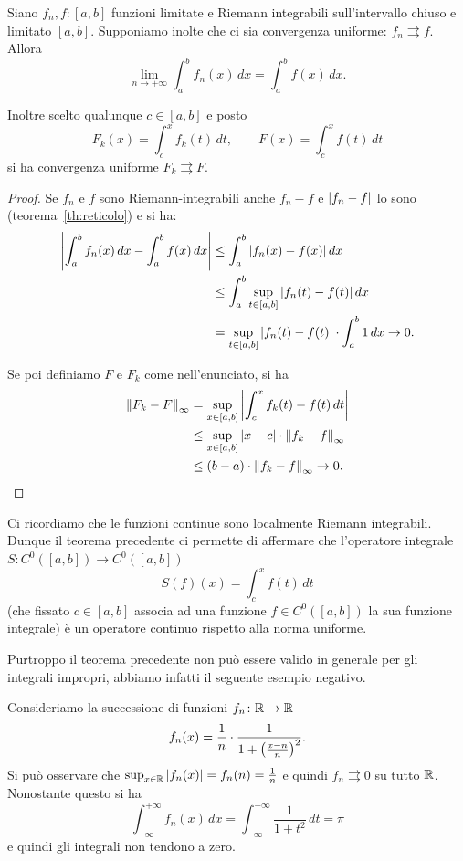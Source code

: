 \begin{theorem}%
  \label{th:scambio_limite_integrale}%
  \mymark{***}%
  Siano $f_n,f\colon [a,b]$ funzioni limitate 
  e Riemann integrabili sull'intervallo chiuso e limitato $[a,b]$.
  Supponiamo inolte che ci sia convergenza uniforme: 
  $f_n \rightrightarrows f$.
  Allora 
  \[
      \lim_{n\to+\infty} \int_a^b f_n(x)\, dx 
      = \int_a^b f(x)\, dx.
  \]

  Inoltre scelto qualunque $c\in [a,b]$ e posto
  \[
    F_k(x) = \int_{c}^x f_k(t)\, dt,
    \qquad
    F(x) = \int_{c}^x f(t)\, dt
  \]
  si ha convergenza uniforme $F_k \rightrightarrows F$.
\end{theorem}
\begin{proof}
  Se $f_n$ e $f$ sono Riemann-integrabili anche $f_n-f$ e ${\left|f_n-f\right|}$ lo sono 
  (teorema~\ref{th:reticolo})
  e si ha:
  \begin{align*}
    {\left|\int_a^b f_n(x)\, dx - \int_a^b f(x)\, dx\right|}
    &\le \int_a^b {\left|f_n(x)-f(x)\right|}\, dx \\
    &\le \int_a^b \sup_{t\in[a,b]} {\left|f_n(t)-f(t)\right|}\, dx \\
    &= \sup_{t\in [a,b]}{\left|f_n(t)-f(t)\right|}\cdot \int_a^b 1\, dx
    \to 0.
  \end{align*}

  Se poi definiamo $F$ e $F_k$ come nell'enunciato, si ha
  \begin{align*}
  {\left\Vert F_k-F\right\Vert}_\infty
  &= \sup_{x\in [a,b]} {\left|\int_c^x f_k(t)-f(t)\, dt\right|} \\
  &\le \sup_{x\in [a,b]} {\left|x-c\right|} \cdot {\left\Vert f_k-f\right\Vert}_\infty \\
  &\le (b-a) \cdot {\left\Vert f_k-f\right\Vert}_\infty
  \to 0.
  \end{align*}
\end{proof}
  
Ci ricordiamo che le funzioni continue sono localmente Riemann integrabili.
Dunque il teorema precedente ci permette di affermare che l'operatore integrale 
$S\colon C^0([a,b]) \to C^0([a,b])$
\[
S(f)(x) = \int_{c}^x f(t)\, dt
\]
(che fissato $c \in [a,b]$ associa ad una funzione $f\in C^0([a,b])$ la sua funzione integrale) 
è un operatore continuo rispetto alla norma uniforme.

Purtroppo il teorema precedente non può essere valido in generale per gli integrali impropri,
abbiamo infatti il seguente esempio negativo.

\begin{example}\label{ex:convergenza_non_dominata}
  Consideriamo la successione di funzioni $f_n\colon {\mathbb R}\to{\mathbb R}$
  \[
    f_n(x) = \frac 1 n \cdot \frac{1}{1+{\left( \frac{x-n} n \right)}^2}.
  \]
  Si può osservare che $\sup_{x\in {\mathbb R}} {\left|f_n(x)\right|} = f_n(n) = \frac 1 n$ 
  e quindi $f_n \rightrightarrows 0$ su tutto ${\mathbb R}$. 
  Nonostante questo si ha 
  \[
  \int_{-\infty}^{+\infty} f_n(x) \, dx  
  = \int_{-\infty}^{+\infty} \frac{1}{1+t^2}\, dt = \pi
  \]
  e quindi gli integrali non tendono a zero.
\end{example}


